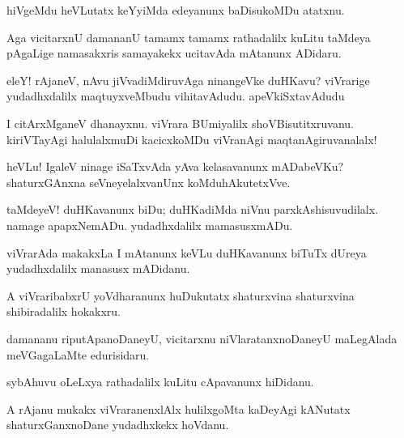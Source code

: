 \documentclass{article}
\begin{document}
\begin{mn}%
hiVgeMdu heVLutatx keYyiMda edeyanunx baDisukoMDu atatxnu.
\end{mn}

\begin{mn}%
Aga vicitarxnU damananU tamamx tamamx rathadalilx kuLitu taMdeya pAgaLige namasakxris 
samayakekx ucitavAda mAtanunx ADidaru.
\end{mn}

\begin{mn}%
eleY! rAjaneV, nAvu jiVvadiMdiruvAga ninangeVke duHKavu? viVrarige yudadhxdalilx 
maqtuyxveMbudu vihitavAdudu. apeVkiSxtavAdudu
\end{mn}

\begin{mn}%
I citArxMganeV dhanayxnu. viVrara BUmiyalilx shoVBisutitxruvanu. kiriVTayAgi halulalxmuDi 
kacicxkoMDu viVranAgi maqtanAgiruvanalalx!
\end{mn}

\begin{mn}%
heVLu! IgaleV ninage iSaTxvAda yAva kelasavanunx mADabeVKu? shaturxGAnxna 
seVneyelalxvanUnx koMduhAkutetxVve.
\end{mn}

\begin{mn}%
taMdeyeV! duHKavanunx biDu; duHKadiMda niVnu parxkAshisuvudilalx. namage apapxNemADu. 
yudadhxdalilx mamasusxmADu.
\end{mn}

\begin{mn}%
viVrarAda makakxLa I mAtanunx keVLu duHKavanunx biTuTx dUreya yudadhxdalilx manasusx 
mADidanu.
\end{mn}

\begin{mn}%
A viVraribabxrU yoVdharanunx huDukutatx shaturxvina shaturxvina shibiradalilx hokakxru.
\end{mn}

\begin{mn}%
damananu riputApanoDaneyU, vicitarxnu niVlaratanxnoDaneyU maLegAlada meVGagaLaMte 
edurisidaru.
\end{mn}

\begin{mn}%
sybAhuvu oLeLxya rathadalilx kuLitu cApavanunx hiDidanu.
\end{mn}

\begin{mn}%
A rAjanu mukakx viVraranenxlAlx hulilxgoMta kaDeyAgi kANutatx shaturxGanxnoDane 
yudadhxkekx hoVdanu.
\end{mn}
\end{document}
